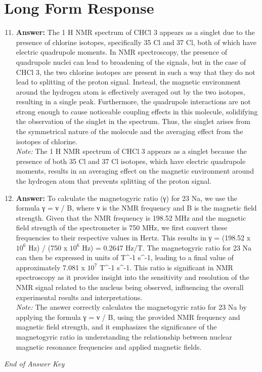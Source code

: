 \documentclass[12pt]{article}
\begin{document}
\section*{Long Form Response}
\begin{enumerate}[label=\arabic*.]
\setcounter{enumi}{10}
\item \textbf{Answer:} The 1 H NMR spectrum of CHCl 3 appears as a singlet due to the presence of chlorine isotopes, specifically 35 Cl and 37 Cl, both of which have electric quadrupole moments. In NMR spectroscopy, the presence of quadrupole nuclei can lead to broadening of the signals, but in the case of CHCl 3, the two chlorine isotopes are present in such a way that they do not lead to splitting of the proton signal. Instead, the magnetic environment around the hydrogen atom is effectively averaged out by the two isotopes, resulting in a single peak. Furthermore, the quadrupole interactions are not strong enough to cause noticeable coupling effects in this molecule, solidifying the observation of the singlet in the spectrum. Thus, the singlet arises from the symmetrical nature of the molecule and the averaging effect from the isotopes of chlorine.
\\ \textit{Note:} The 1 H NMR spectrum of CHCl 3 appears as a singlet because the presence of both 35 Cl and 37 Cl isotopes, which have electric quadrupole moments, results in an averaging effect on the magnetic environment around the hydrogen atom that prevents splitting of the proton signal.
\item \textbf{Answer:} To calculate the magnetogyric ratio (γ) for 23 Na, we use the formula γ = ν / B, where ν is the NMR frequency and B is the magnetic field strength. Given that the NMR frequency is 198.52 MHz and the magnetic field strength of the spectrometer is 750 MHz, we first convert these frequencies to their respective values in Hertz. This results in γ = (198.52 x $10^6$ Hz) / (750 x $10^6$ Hz) = 0.2647 Hz/T. The magnetogyric ratio for 23 Na can then be expressed in units of T^-1 s^-1, leading to a final value of approximately 7.081 x $10^7$ T^-1 s^-1. This ratio is significant in NMR spectroscopy as it provides insight into the sensitivity and resolution of the NMR signal related to the nucleus being observed, influencing the overall experimental results and interpretations.
\\ \textit{Note:} The answer correctly calculates the magnetogyric ratio for 23 Na by applying the formula γ = ν / B, using the provided NMR frequency and magnetic field strength, and it emphasizes the significance of the magnetogyric ratio in understanding the relationship between nuclear magnetic resonance frequencies and applied magnetic fields.
\end{enumerate}

\vfill
\noindent\textit{End of Answer Key}
\end{document}
